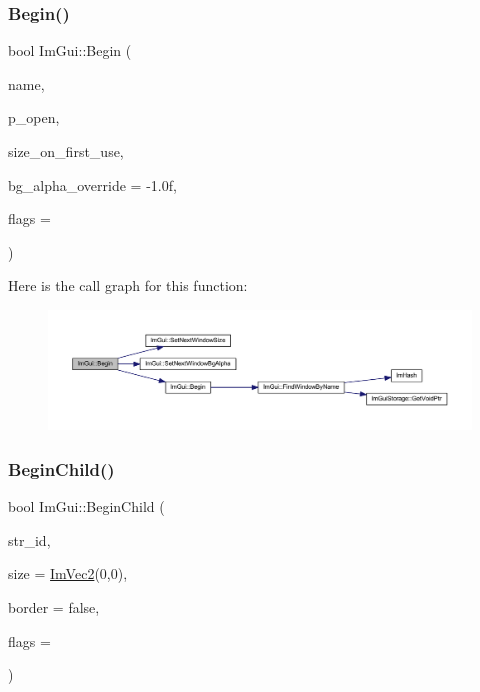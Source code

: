 \subsubsection{\texorpdfstring{Begin()}{Begin()}\hspace{0.1cm}{\footnotesize\ttfamily [2/2]}}
{\footnotesize\ttfamily bool Im\+Gui\+::\+Begin (\begin{DoxyParamCaption}\item[{const char $\ast$}]{name,  }\item[{bool $\ast$}]{p\+\_\+open,  }\item[{const \mbox{\hyperlink{struct_im_vec2}{Im\+Vec2}} \&}]{size\+\_\+on\+\_\+first\+\_\+use,  }\item[{float}]{bg\+\_\+alpha\+\_\+override = {\ttfamily -\/1.0f},  }\item[{\mbox{\hyperlink{imgui_8h_a0b8e067ab4f7a818828c8d89e531addc}{Im\+Gui\+Window\+Flags}}}]{flags = {} }\end{DoxyParamCaption})}

Here is the call graph for this function\+:
\nopagebreak
\begin{figure}[H]
\begin{center}
\leavevmode
\includegraphics[width=350pt]{namespace_im_gui_a288e01ff1c8102d6374a6b1e409b9878_cgraph}
\end{center}
\end{figure}
\mbox{\label{namespace_im_gui_a5db08f552118a1f946e19b5933dce181}} 
\subsubsection{\texorpdfstring{Begin\+Child()}{BeginChild()}\hspace{0.1cm}{\footnotesize\ttfamily [1/2]}}
{\footnotesize\ttfamily bool Im\+Gui\+::\+Begin\+Child (\begin{DoxyParamCaption}\item[{const char $\ast$}]{str\+\_\+id,  }\item[{const \mbox{\hyperlink{struct_im_vec2}{Im\+Vec2}} \&}]{size = {\ttfamily \mbox{\hyperlink{struct_im_vec2}{Im\+Vec2}}(0,0)},  }\item[{bool}]{border = {\ttfamily false},  }\item[{\mbox{\hyperlink{imgui_8h_a0b8e067ab4f7a818828c8d89e531addc}{Im\+Gui\+Window\+Flags}}}]{flags = {} }\end{DoxyParamCaption})}

